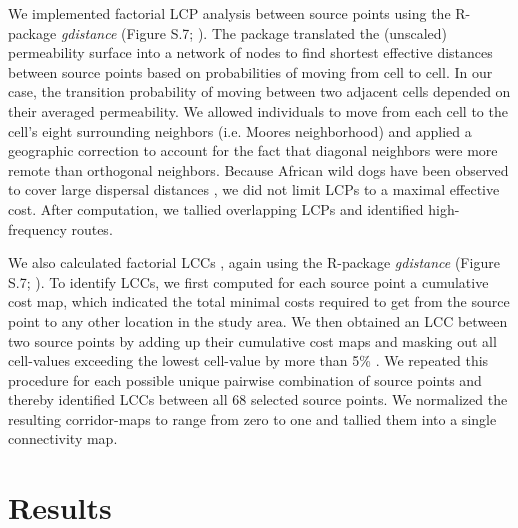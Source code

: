 \documentclass[abstract=on,10pt,a4paper,bibliography=totocnumbered]{article}
\begin{document}
We implemented factorial LCP analysis between source points using the R-package
\textit{gdistance} (Figure S.7; \citealp{vanEtten.2017}). The package translated
the (unscaled) permeability surface into a network of nodes to find shortest
effective distances between source points based on probabilities of moving from
cell to cell. In our case, the transition probability of moving between two
adjacent cells depended on their averaged permeability. We allowed individuals
to move from each cell to the cell's eight surrounding neighbors (i.e. Moores
neighborhood) and applied a geographic correction to account for the fact that
diagonal neighbors were more remote than orthogonal neighbors. Because African
wild dogs have been observed to cover large dispersal distances
\citep{DaviesMostert.2012, Masenga.2016, Cozzi.2020}, we did not limit LCPs to a
maximal effective cost. After computation, we tallied overlapping LCPs and
identified high-frequency routes.

We also calculated factorial LCCs \citep{Pinto.2009, Sawyer.2011, Elliot.2014},
again using the R-package \textit{gdistance} (Figure S.7;
\citealp{vanEtten.2017}). To identify LCCs, we first computed for each source
point a cumulative cost map, which indicated the total minimal costs required to
get from the source point to any other location in the study area. We then
obtained an LCC between two source points by adding up their cumulative cost
maps and masking out all cell-values exceeding the lowest cell-value by more
than 5\% \citep{Pinto.2009}. We repeated this procedure for each possible unique
pairwise combination of source points and thereby identified LCCs between all 68
selected source points. We normalized the resulting corridor-maps to range from
zero to one and tallied them into a single connectivity map.

\section{Results}
\end{document}
